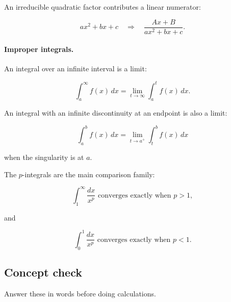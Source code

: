 An irreducible quadratic factor contributes a linear numerator:

\[
ax^2+bx+c
\quad\Longrightarrow\quad
\frac{Ax+B}{ax^2+bx+c}.
\]

\paragraph{Improper integrals.}

An integral over an infinite interval is a limit:

\[
\boxed{
\int_a^\infty f(x)\,dx
=
\lim_{t\to\infty}\int_a^t f(x)\,dx.
}
\]

An integral with an infinite discontinuity at an endpoint is also a limit:

\[
\boxed{
\int_a^b f(x)\,dx
=
\lim_{t\to a^+}\int_t^b f(x)\,dx
}
\]

when the singularity is at \(a\).

The \(p\)-integrals are the main comparison family:

\[
\boxed{
\int_1^\infty \frac{dx}{x^p}
\text{ converges exactly when }p>1,
}
\]

and

\[
\boxed{
\int_0^1 \frac{dx}{x^p}
\text{ converges exactly when }p<1.
}
\]

\subsection{Concept check}
\label{subsec:chapter-11-concept-check}

Answer these in words before doing calculations.

